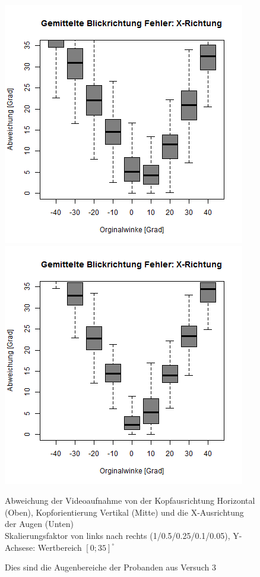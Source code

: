 \begin{landscape}
\begin{figure}
		\includegraphics[width=0.192\linewidth]{OpenFace_Img/EyeAVG_x_Err_S01}
		\includegraphics[width=0.192\linewidth]{OpenFace_Img/EyeAVG_x_Err_S005}
		\caption{Abweichung der Videoaufnahme von der Kopfausrichtung Horizontal (Oben), Kopforientierung Vertikal (Mitte) und die X-Ausrichtung der Augen (Unten)\\Skalierungsfaktor von links nach rechts (1/0.5/0.25/0.1/0.05), Y-Achsese: Wertbereich $[0;35]^\circ$}
		\label{graph_VideoSkalierung_Err}
	\end{figure}
\begin{figure}
	\centering
	
	\caption{Dies sind die Augenbereiche der Probanden aus Versuch 3}
	\label{Augenbereich_Versuch3}
\end{figure}
\end{landscape}
